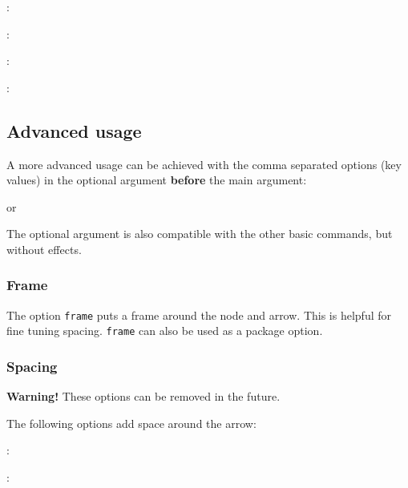 \documentclass[12pt]{article}
\begin{document}
\begin{bulItem}
\item {}: \bigskip

\item {}: \bigskip

\item {}: \bigskip

\item {}: 
\end{bulItem}

\subsection{Advanced usage}

A more advanced usage can be achieved with the comma separated options (key values) in the optional argument \textbf{before} the main argument:\bigskip

{\centering{} or \par}\bigskip

The optional argument is also compatible with the other basic commands, but without effects.

\subsubsection{Frame}\label{sec:frame}

The option \verb|frame| puts a frame around the node and arrow. This is helpful for fine tuning spacing. \verb|frame| can also be used as a package option.\medskip

{
\centering{}\bigskip

\par
}

\subsubsection{Spacing}

{\color{red}\textbf{Warning!}} These options can be removed in the future.\bigskip

The following options add space around the arrow:\bigskip

\begin{bulItem}
\item {}: \bigskip

\item {}: 
\end{bulItem}
\end{document}
